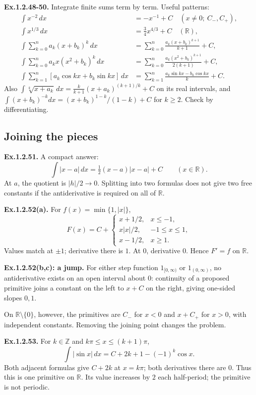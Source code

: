 \documentclass[11pt,letterpaper]{article}
\begin{document}
\textbf{Ex.1.2.48-50.} Integrate finite sums term by term. Useful
patterns: \[
\begin{aligned}
\int x^{-2}\,dx&=-x^{-1}+C\quad(x\ne0;\ C_-,C_+),\\
\int x^{1/3}\,dx&=\tfrac34x^{4/3}+C\quad(\mathbb R),\\
\int\sum_{k=0}^n a_k(x+b_k)^k\,dx
&=\sum_{k=0}^n\frac{a_k(x+b_k)^{k+1}}{k+1}+C,\\
\int\sum_{k=0}^n a_kx(x^2+b_k)^k\,dx
&=\sum_{k=0}^n\frac{a_k(x^2+b_k)^{k+1}}{2(k+1)}+C,\\
\int\sum_{k=1}^n[a_k\cos kx+b_k\sin kx]\,dx
&=\sum_{k=1}^n\frac{a_k\sin kx-b_k\cos kx}{k}+C.
\end{aligned}
\] Also \(\int\sqrt[k]{x+a_k}\,dx=\frac{k}{k+1}(x+a_k)^{(k+1)/k}+C\) on
its real intervals, and \(\int(x+b_k)^{-k}dx=(x+b_k)^{1-k}/(1-k)+C\) for
\(k\ge2\). Check by differentiating.

\subsection{Joining the pieces}\label{joining-the-pieces}

\textbf{Ex.1.2.51.} A compact answer: \[
\int|x-a|\,dx=\tfrac12(x-a)|x-a|+C\qquad(x\in\mathbb R).
\] At \(a\), the quotient is \(|h|/2\to0\). Splitting into two formulas
does not give two free constants if the antiderivative is required on
all of \(\mathbb R\).

\textbf{Ex.1.2.52(a).} For \(f(x)=\min\{1,|x|\}\), \[
F(x)=C+\begin{cases}
x+1/2,&x\le-1,\\
x|x|/2,&-1\le x\le1,\\
x-1/2,&x\ge1.
\end{cases}
\] Values match at \(\pm1\); derivative there is \(1\). At \(0\),
derivative \(0\). Hence \(F'=f\) on \(\mathbb R\).

\textbf{Ex.1.2.52(b,c): a jump.} For either step function
\(1_{[0,\infty)}\) or \(1_{(0,\infty)}\), no antiderivative exists on an
open interval about \(0\): continuity of a proposed primitive joins a
constant on the left to \(x+C\) on the right, giving one-sided slopes
\(0,1\).

On \(\mathbb R\setminus\{0\}\), however, the primitives are \(C_-\) for
\(x<0\) and \(x+C_+\) for \(x>0\), with independent constants. Removing
the joining point changes the problem.

\textbf{Ex.1.2.53.} For \(k\in\mathbb Z\) and \(k\pi\le x\le(k+1)\pi\),
\[
\int|\sin x|\,dx=C+2k+1-(-1)^k\cos x.
\] Both adjacent formulas give \(C+2k\) at \(x=k\pi\); both derivatives
there are \(0\). Thus this is one primitive on \(\mathbb R\). Its value
increases by \(2\) each half-period; the primitive is not periodic.
\end{document}
